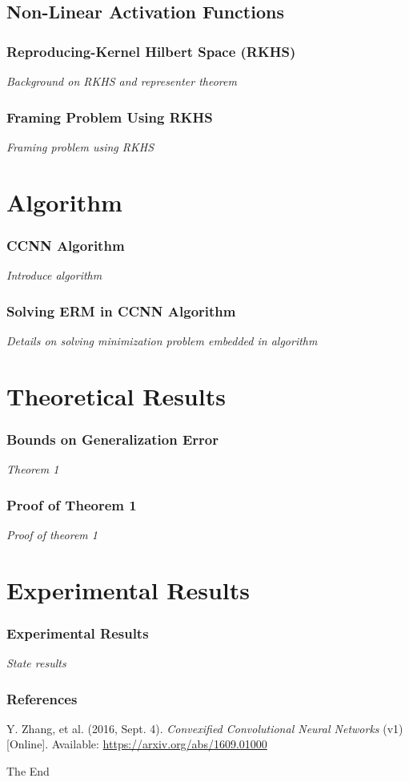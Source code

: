 \documentclass{beamer}
\begin{document}
\subsection{Non-Linear Activation Functions}
\begin{frame}
	\frametitle{Reproducing-Kernel Hilbert Space (RKHS)}
	\textit{Background on RKHS and representer theorem}
\end{frame}

\begin{frame}
	\frametitle{Framing Problem Using RKHS}
	\textit{Framing problem using RKHS}
\end{frame}

\section{Algorithm}
\begin{frame}
	\frametitle{CCNN Algorithm}
	\textit{Introduce algorithm}
\end{frame}

\begin{frame}
	\frametitle{Solving ERM in CCNN Algorithm}
	\textit{Details on solving minimization problem embedded in algorithm}
\end{frame}

\section{Theoretical Results}
\begin{frame}
	\frametitle{Bounds on Generalization Error}
	\textit{Theorem 1}
\end{frame}

\begin{frame}
	\frametitle{Proof of Theorem 1}
	\textit{Proof of theorem 1}
\end{frame}

\section{Experimental Results}
\begin{frame}
	\frametitle{Experimental Results}
	\textit{State results}
\end{frame}


\begin{frame}
	\frametitle{References}
	\footnotesize{
		\begin{thebibliography}{9} %
			Y. Zhang, et al. (2016, Sept. 4).
			\emph{Convexified Convolutional Neural Networks} (v1) [Online].
			Available: \url{https://arxiv.org/abs/1609.01000}
		\end{thebibliography}
	}
\end{frame}


\begin{frame}
	\Huge{\centerline{The End}}
\end{frame}
\end{document}
